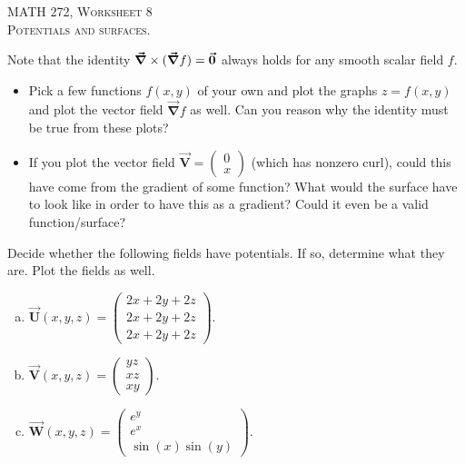 \documentclass[12pt]{article} %
\newcommand{\vecfieldV}{\boldsymbol{\vec{V}}}
\newcommand{\vecfieldW}{\boldsymbol{\vec{W}}}
\newcommand{\vecfieldU}{\boldsymbol{\vec{U}}}
\newcommand{\grad}{\boldsymbol{\vec{\nabla}}}
\begin{document}
\begin{center}
   \textsc{\large MATH 272, Worksheet 8}\\
   \textsc{Potentials and surfaces.}
\end{center}
\vspace{.5cm}

\begin{problem}
    Note that the identity $\grad \times (\grad f)=\zerovec$ always holds for any smooth scalar field $f$. 
    \begin{itemize}
        \item Pick a few functions $f(x,y)$ of your own and plot the graphs $z=f(x,y)$ and plot the vector field $\grad f$ as well.  Can you reason why the identity must be true from these plots? 
        \item If you plot the vector field $\vecfieldV = \begin{pmatrix} 0 \\ x \end{pmatrix}$ (which has nonzero curl), could this have come from the gradient of some function? What would the surface have to look like in order to have this as a gradient? Could it even be a valid function/surface?
    \end{itemize}
\end{problem}

\begin{problem}
    Decide whether the following fields have potentials.  If so, determine what they are. Plot the fields as well.
    \begin{enumerate}[(a)]
        \item $\vecfieldU(x,y,z) = \begin{pmatrix} 2x + 2y + 2z \\ 2x + 2y + 2z \\ 2x + 2y + 2z \end{pmatrix}$.
        \item $\vecfieldV(x,y,z) = \begin{pmatrix} yz \\ xz \\ xy \end{pmatrix}$.
        \item $\vecfieldW(x,y,z) = \begin{pmatrix} e^y \\ e^x \\ \sin(x)\sin(y) \end{pmatrix}$.
    \end{enumerate}
\end{problem}
\end{document}
